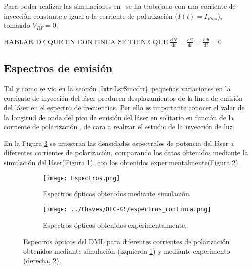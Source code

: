 
Para poder realizar las simulaciones en \cw\ se ha trabajado con una corriente de inyección constante e igual a la corriente de polarización ($I(t) = I_{Bias}$), tomando $V_{RF} = 0$.

HABLAR DE QUE EN CONTINUA SE TIENE QUE $\frac{\mathrm{d} N}{\mathrm{d} t} = \frac{\mathrm{d} S}{\mathrm{d} t} = \frac{\mathrm{d} \Phi}{\mathrm{d} t} = 0$

\subsection{Espectros de emisión}

	Tal y como se vio en la secci\'on \ref{Intr:LsrSmcdtr}, pequeñas variaciones en la corriente de inyección del láser producen desplazamientos de la línea de emisión del láser en el espectro de frecuencias. Por ello es importante conocer el valor de la longitud de onda del pico de emisión del láser en solitario en función de la corriente de polarización \ibias, de cara a realizar el estudio de la inyección de luz.

	En la Figura \ref{Img:spectrosCW} se muestran las densidades espectrales de potencia del l\'aser a diferentes corrientes de polarización, comparando los datos obtenidos mediante la simulaci\'on del l\'aser(Figura \ref{Img:spectrosCW:sim}), con los obtenidos experimentalmente(Figura \ref{Img:spectrosCW:exp}).

		\begin{figure}[H]
			\centering
			\begin{subfigure}{0.45\textwidth}
				\centering
				\texttt{[image: Espectros.png]}
				\caption{\label{Img:spectrosCW:sim}Espectros ópticos obtenidos mediante simulación.}
			\end{subfigure}
			\begin{subfigure}{0.45\textwidth}
				\centering
				\texttt{[image: ../Chaves/OFC-GS/espectros\_continua.png]}
				\caption{\label{Img:spectrosCW:exp}Espectros ópticos obtenidos experimentalmente.}	
			\end{subfigure}
			\caption{\label{Img:spectrosCW}Espectros ópticos del DML para diferentes corrientes de polarización \ibias obtenidos mediante simulación (izquierda \ref{Img:spectrosCW:sim}) y mediante experimento (derecha, \ref{Img:spectrosCW:exp}).}
		\end{figure}

